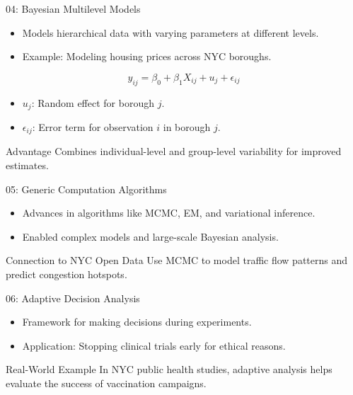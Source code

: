 \documentclass{beamer}
\begin{document}
\begin{frame}{04: Bayesian Multilevel Models}
\begin{itemize}
    \item Models hierarchical data with varying parameters at different levels.
    \item Example: Modeling housing prices across NYC boroughs.
\end{itemize}

\[
y_{ij} = \beta_0 + \beta_1 X_{ij} + u_j + \epsilon_{ij}
\]
\begin{itemize}
    \item \( u_j \): Random effect for borough \( j \).
    \item \( \epsilon_{ij} \): Error term for observation \( i \) in borough \( j \).
\end{itemize}

\begin{block}{Advantage}
Combines individual-level and group-level variability for improved estimates.
\end{block}
\end{frame}

\begin{frame}{05: Generic Computation Algorithms}
\begin{itemize}
    \item Advances in algorithms like MCMC, EM, and variational inference.
    \item Enabled complex models and large-scale Bayesian analysis.
\end{itemize}

\begin{block}{Connection to NYC Open Data}
Use MCMC to model traffic flow patterns and predict congestion hotspots.
\end{block}
\end{frame}

\begin{frame}{06: Adaptive Decision Analysis}
\begin{itemize}
    \item Framework for making decisions during experiments.
    \item Application: Stopping clinical trials early for ethical reasons.
\end{itemize}

\begin{block}{Real-World Example}
In NYC public health studies, adaptive analysis helps evaluate the success of vaccination campaigns.
\end{block}
\end{frame}
\end{document}
